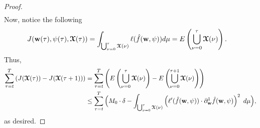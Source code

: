 \begin{proof}
\begin{align*}
    \end{align*}
    Now, notice the following
    \begin{align*}
        J(\boldsymbol{\mathrm{w}}(\tau),\psi(\tau),\boldsymbol{\mathcal{X}}(\tau)) & = \int_{\bigcup_{\nu = 0}^\tau \boldsymbol{\mathcal{X}}(\nu)} \ell(\hat{f}(\boldsymbol{\mathrm{w}},\psi))d\mu = E\left(\bigcup_{\nu = 0}^{\tau}\boldsymbol{\mathcal{X}}(\nu)\right).
    \end{align*}
    Thus,
    \begin{align*}
         \sum_{\tau = t}^{T} \left(J(\boldsymbol{\mathcal{X}}(\tau)) - J(\boldsymbol{\mathcal{X}}(\tau+1))\right)
         & = \sum_{\tau = t}^{T} \left(E\left(\bigcup_{\nu = 0}^{\tau}\boldsymbol{\mathcal{X}}(\nu)\right) - E\left(\bigcup_{\nu = 0}^{\tau+1}\boldsymbol{\mathcal{X}}(\nu)\right)\right)\\
        & \leq \sum_{\tau =t}^{T} \Big( M_0\cdot \delta - \displaystyle\int_{\bigcup_{\nu = 0}^\tau\boldsymbol{\mathcal{X}}(\nu)} \left(\ell'(\hat{f}(\boldsymbol{\mathrm{w}},\psi))\cdot \partial_{\boldsymbol{\mathrm{w}}}^1 \hat{f}(\boldsymbol{\mathrm{w}},\psi)\right)^2 \hspace{1mm}  d\mu \Big),
    \end{align*}
    as desired.
\end{proof}



